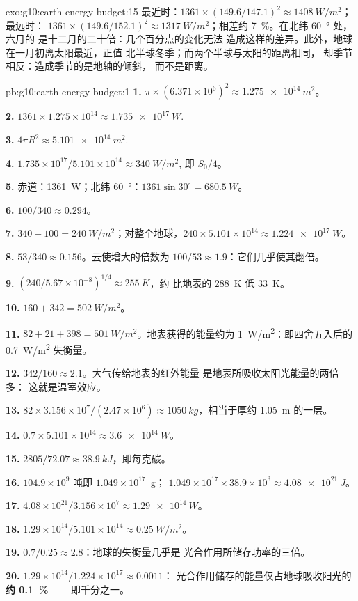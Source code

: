 \begin{solution}{exo:g10:earth-energy-budget:15}
最近时：$1361 \times (149.6/147.1)^2 \approx \qty{1408}{W/m^2}$；最远时：
$1361 \times (149.6/152.1)^2 \approx \qty{1317}{W/m^2}$；相差约
\qty{7}{\percent}。在北纬 \qty{60}{\degree} 处，六月的
是十二月的二十倍：几个百分点的变化无法
造成这样的差异。此外，地球在一月初离太阳最近，正值
北半球冬季；而两个半球与太阳的距离相同，
却季节相反：造成季节的是地轴的倾斜，
而不是距离。
\end{solution}

\begin{solution}{pb:g10:earth-energy-budget:1}
\textbf{1.} $\pi \times (6.371\times10^6)^2 \approx \qty{1.275e14}{m^2}$。

\textbf{2.} $1361 \times 1.275\times10^{14} \approx \qty{1.735e17}{W}$.

\textbf{3.} $4\pi R^2 \approx \qty{5.101e14}{m^2}$.

\textbf{4.} $1.735\times10^{17}/5.101\times10^{14} \approx \qty{340}{W/m^2}$,
即 $S_0/4$。

\textbf{5.} 赤道：\qty{1361}{W}；北纬 \qty{60}{\degree}：$1361 \sin
30^\circ = \qty{680.5}{W}$。

\textbf{6.} $100/340 \approx 0.294$。

\textbf{7.} $340 - 100 = \qty{240}{W/m^2}$；对整个地球，$240 \times
5.101\times10^{14} \approx \qty{1.224e17}{W}$。

\textbf{8.} $53/340 \approx 0.156$。云使增大的倍数为
$100/53 \approx 1.9$：它们几乎使其翻倍。

\textbf{9.} $(240/5.67\times10^{-8})^{1/4} \approx \qty{255}{K}$，约
比地表的 \qty{288}{K} 低 \qty{33}{K}。

\textbf{10.} $160 + 342 = \qty{502}{W/m^2}$。

\textbf{11.} $82 + 21 + 398 = \qty{501}{W/m^2}$。地表获得的能量约为
\qty{1}{W/m^2}：即四舍五入后的 \qty{0.7}{W/m^2} 失衡量。

\textbf{12.} $342/160 \approx 2.1$。大气传给地表的红外能量
是地表所吸收太阳光能量的两倍多：
这就是温室效应。

\textbf{13.} $82 \times 3.156\times10^7/(2.47\times10^6) \approx
\qty{1050}{kg}$，相当于厚约 \qty{1.05}{m} 的一层。

\textbf{14.} $0.7 \times 5.101\times10^{14} \approx \qty{3.6e14}{W}$。

\textbf{15.} $2805/72.07 \approx \qty{38.9}{kJ}$，即每克碳。

\textbf{16.} $104.9\times10^9$ 吨即 $1.049\times10^{17}$~g；
$1.049\times10^{17} \times 38.9\times10^3 \approx \qty{4.08e21}{J}$。

\textbf{17.} $4.08\times10^{21}/3.156\times10^7 \approx \qty{1.29e14}{W}$。

\textbf{18.} $1.29\times10^{14}/5.101\times10^{14} \approx
\qty{0.25}{W/m^2}$。

\textbf{19.} $0.7/0.25 \approx 2.8$：地球的失衡量几乎是
光合作用所储存功率的三倍。

\textbf{20.} $1.29\times10^{14}/1.224\times10^{17} \approx 0.0011$：
光合作用储存的能量仅占地球吸收阳光的\textbf{约 \qty{0.1}{\percent}}
——即千分之一。
\end{solution}
